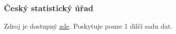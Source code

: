 \documentclass[12pt]{article}
\begin{document}








\subsubsection{Český statistický úřad}
\label{data3}
Zdroj je dostupný \href{https://www.czso.cz/csu/czso/obyvatelstvo-podle-petiletych-vekovych-skupin-a-pohlavi-v-krajich-a-okresech}{zde}. Poskytuje pouze 1 dilčí sadu dat.
\end{document}
